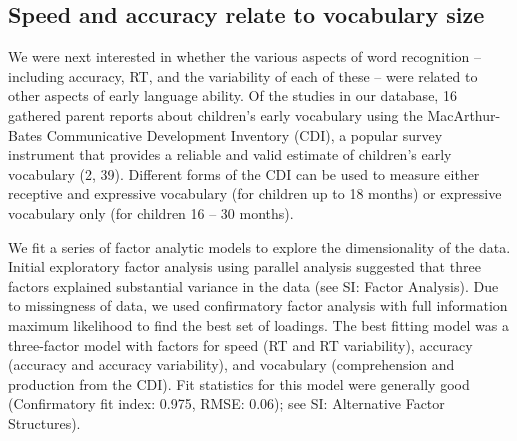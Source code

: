 \documentclass[9pt,twocolumn,twoside,]{pnas-new}
\begin{document}
\subsection*{Speed and accuracy relate to vocabulary
size}\label{speed-and-accuracy-relate-to-vocabulary-size}

We were next interested in whether the various aspects of word
recognition -- including accuracy, RT, and the variability of each of
these -- were related to other aspects of early language ability. Of the
studies in our database, 16 gathered parent reports about children's
early vocabulary using the MacArthur-Bates Communicative Development
Inventory (CDI), a popular survey instrument that provides a reliable
and valid estimate of children's early vocabulary (2, 39). Different
forms of the CDI can be used to measure either receptive and expressive
vocabulary (for children up to 18 months) or expressive vocabulary only
(for children 16 -- 30 months).

We fit a series of factor analytic models to explore the dimensionality
of the data. Initial exploratory factor analysis using parallel analysis
suggested that three factors explained substantial variance in the data
(see SI: Factor Analysis). Due to missingness of data, we used
confirmatory factor analysis with full information maximum likelihood to
find the best set of loadings. The best fitting model was a three-factor
model with factors for speed (RT and RT variability), accuracy (accuracy
and accuracy variability), and vocabulary (comprehension and production
from the CDI). Fit statistics for this model were generally good
(Confirmatory fit index: 0.975, RMSE: 0.06); see SI: Alternative Factor
Structures).
\end{document}
